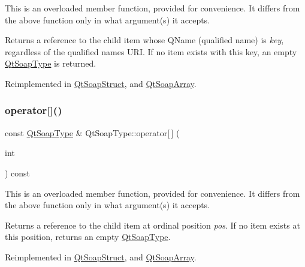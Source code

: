 This is an overloaded member function, provided for convenience. It differs from the above function only in what argument(s) it accepts.

Returns a reference to the child item whose Q\+Name (qualified name) is {\itshape key}, regardless of the qualified name\textquotesingle{}s U\+RI. If no item exists with this key, an empty \mbox{\hyperlink{class_qt_soap_type}{Qt\+Soap\+Type}} is returned. 

Reimplemented in \mbox{\hyperlink{class_qt_soap_struct_a53d62e284629dee8e40a7252af09dd24}{Qt\+Soap\+Struct}}, and \mbox{\hyperlink{class_qt_soap_array_a4028a389d34e4420d3b5a37f44817f51}{Qt\+Soap\+Array}}.

\mbox{\label{class_qt_soap_type_a7d49c20ea814bd667f13c3b1f40f1a47}} 
\subsubsection{\texorpdfstring{operator[]()}{operator[]()}\hspace{0.1cm}{\footnotesize\ttfamily [4/6]}}
{\footnotesize\ttfamily const \mbox{\hyperlink{class_qt_soap_type}{Qt\+Soap\+Type}} \& Qt\+Soap\+Type\+::operator\mbox{[}$\,$\mbox{]} (\begin{DoxyParamCaption}\item[{int}]{ }\end{DoxyParamCaption}) const\hspace{0.3cm}{\ttfamily [virtual]}}

This is an overloaded member function, provided for convenience. It differs from the above function only in what argument(s) it accepts.

Returns a reference to the child item at ordinal position {\itshape pos}. If no item exists at this position, returns an empty \mbox{\hyperlink{class_qt_soap_type}{Qt\+Soap\+Type}}. 

Reimplemented in \mbox{\hyperlink{class_qt_soap_struct_a07bf701388dfc9ee083e6549566543b4}{Qt\+Soap\+Struct}}, and \mbox{\hyperlink{class_qt_soap_array_ae5fc26685177339767ec39f8fd900738}{Qt\+Soap\+Array}}.

\mbox{\label{class_qt_soap_type_af77eaf6be2bfbf3635195146a579861b}} 
